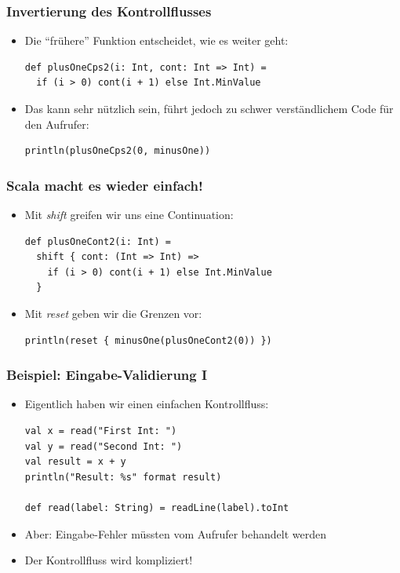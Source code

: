 \documentclass{beamer}
\begin{document}
\begin{frame}[fragile]
  \frametitle{Invertierung des Kontrollflusses}
  \begin{itemize}
    \item Die "`fr\"uhere"' Funktion entscheidet, wie es weiter geht:
    \begin{lstlisting}
def plusOneCps2(i: Int, cont: Int => Int) =
  if (i > 0) cont(i + 1) else Int.MinValue
    \end{lstlisting}
    \item Das kann sehr n\"utzlich sein, f\"uhrt jedoch zu schwer verst\"andlichem Code f\"ur den Aufrufer:
    \begin{lstlisting}
println(plusOneCps2(0, minusOne))
    \end{lstlisting}
  \end{itemize}
\end{frame}

\begin{frame}[fragile]
  \frametitle{Scala macht es wieder einfach!}
  \begin{itemize}
    \item Mit \emph{shift} greifen wir uns eine Continuation:
    \begin{lstlisting}
def plusOneCont2(i: Int) =
  shift { cont: (Int => Int) =>
    if (i > 0) cont(i + 1) else Int.MinValue
  }
    \end{lstlisting}
    \item Mit \emph{reset} geben wir die Grenzen vor:
    \begin{lstlisting}
println(reset { minusOne(plusOneCont2(0)) })
    \end{lstlisting}
  \end{itemize}
\end{frame}

\begin{frame}[fragile]
  \frametitle{Beispiel: Eingabe-Validierung I}
  \begin{itemize}
    \item Eigentlich haben wir einen einfachen Kontrollfluss:
    \begin{lstlisting}
val x = read("First Int: ")
val y = read("Second Int: ")
val result = x + y
println("Result: %s" format result)

def read(label: String) = readLine(label).toInt
    \end{lstlisting}
    \item Aber: Eingabe-Fehler m\"ussten vom Aufrufer behandelt werden
    \item Der Kontrollfluss wird kompliziert!
  \end{itemize}
\end{frame}
\end{document}
